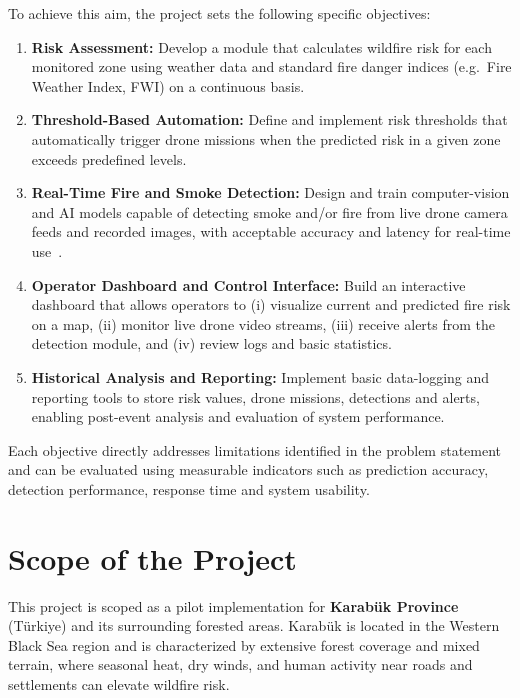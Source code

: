 \documentclass[11pt,a4paper]{report}
\begin{document}
To achieve this aim, the project sets the following specific objectives:

\begin{enumerate}
  \item \textbf{Risk Assessment:} Develop a module that calculates wildfire risk for each monitored zone using weather data and standard fire danger indices (e.g.\ Fire Weather Index, FWI) on a continuous basis.
  \item \textbf{Threshold-Based Automation:} Define and implement risk thresholds that automatically trigger drone missions when the predicted risk in a given zone exceeds predefined levels.
  \item \textbf{Real-Time Fire and Smoke Detection:} Design and train computer-vision and AI models capable of detecting smoke and/or fire from live drone camera feeds and recorded images, with acceptable accuracy and latency for real-time use~\cite{almeida2022}.
  \item \textbf{Operator Dashboard and Control Interface:} Build an interactive dashboard that allows operators to (i) visualize current and predicted fire risk on a map, (ii) monitor live drone video streams, (iii) receive alerts from the detection module, and (iv) review logs and basic statistics.
  \item \textbf{Historical Analysis and Reporting:} Implement basic data-logging and reporting tools to store risk values, drone missions, detections and alerts, enabling post-event analysis and evaluation of system performance.
\end{enumerate}

Each objective directly addresses limitations identified in the problem statement and can be evaluated using measurable indicators such as prediction accuracy, detection performance, response time and system usability.

\clearpage


\section{Scope of the Project}

This project is scoped as a pilot implementation for \textbf{Karabük Province} (Türkiye) and its
surrounding forested areas. Karabük is located in the Western Black Sea region and is characterized
by extensive forest coverage and mixed terrain, where seasonal heat, dry winds, and human activity
near roads and settlements can elevate wildfire risk.
\end{document}
